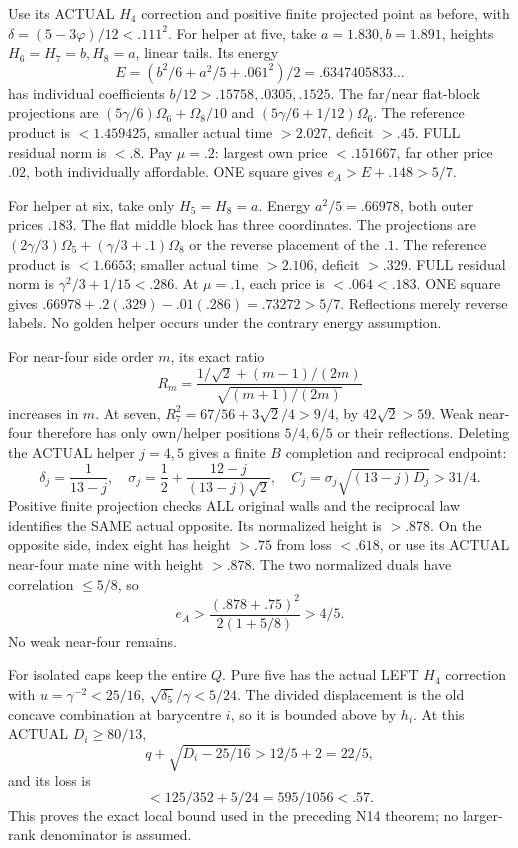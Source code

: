 \documentclass[11pt]{article}
\begin{document}
Use its ACTUAL \(H_4\) correction and positive
finite projected point as before, with
\(\delta=(5-3\varphi)/12<.111^2\).
For helper at five, take
\(a=1.830,b=1.891\), heights
\(H_6=H_7=b,H_8=a\), linear tails.
Its energy
\[
                 E=(b^2/6+a^2/5+.061^2)/2=.6347405833\ldots
\]
has individual coefficients
\(b/12>.15758,.0305,.1525\).
The far/near flat-block projections are
\((5\gamma/6)\Omega_6+\Omega_8/10\) and
\((5\gamma/6+1/12)\Omega_6\).
The reference product is \(<1.459425\),
smaller actual time \(>2.027\), deficit \(>.45\).
FULL residual norm is \(<.8\).
Pay \(\mu=.2\): largest own price
\(<.151667\), far other price \(.02\),
both individually affordable.
ONE square gives \(e_A>E+.148>5/7\).

For helper at six, take only \(H_5=H_8=a\).
Energy \(a^2/5=.66978\), both outer prices \(.183\).
The flat middle block has three coordinates.
The projections are
\((2\gamma/3)\Omega_5+(\gamma/3+.1)\Omega_8\)
or the reverse placement of the \(.1\).
The reference product is \(<1.6653\);
smaller actual time \(>2.106\), deficit \(>.329\).
FULL residual norm is \(\gamma^2/3+1/15<.286\).
At \(\mu=.1\), each price is \(<.064<.183\).
ONE square gives
\(.66978+.2(.329)-.01(.286)=.73272>5/7\).
Reflections merely reverse labels.
No golden helper occurs under the contrary
energy assumption.

For near-four side order \(m\), its exact ratio
\[
 R_m={\frac{1/\sqrt2+(m-1)/(2m)}{\sqrt{(m+1)/(2m)}}}
\]
increases in \(m\).
At seven,
\(R_7^2=67/56+3\sqrt2/4>9/4\), by \(42\sqrt2>59\).
Weak near-four therefore has only own/helper
positions \(5/4,6/5\) or their reflections.
Deleting the ACTUAL helper \(j=4,5\) gives a
finite \(B\) completion and reciprocal endpoint:
\[
 \delta_j={\frac{1}{13-j}},\quad
 \sigma_j={\frac{1}{2}}+{\frac{12-j}{(13-j)\sqrt2}},\quad
 C_j=\sigma_j\sqrt{(13-j)D_j}>31/4.
\]
Positive finite projection checks ALL original
walls and the reciprocal law identifies the
SAME actual opposite.
Its normalized height is \(>.878\).
On the opposite side, index eight has height
\(>.75\) from loss \(<.618\), or use its ACTUAL
near-four mate nine with height \(>.878\).
The two normalized duals have correlation
\(\le5/8\), so
\[
                       e_A>{\frac{(.878+.75)^2}{2(1+5/8)}}>4/5.
\]
No weak near-four remains.

For isolated caps keep the entire \(Q\).
Pure five has the actual LEFT \(H_4\)
correction with
\(u=\gamma^{-2}<25/16\),
\(\sqrt{\delta_5}/\gamma<5/24\).
The divided displacement is the old concave
combination at barycentre \(i\), so it is
bounded above by \(h_i\).
At this ACTUAL \(D_i\ge80/13\),
\[
 q+\sqrt{D_i-25/16}>12/5+2=22/5,
\]
and its loss is
\[
                    <125/352+5/24=595/1056<.57 .
\]
This proves the exact local bound used in
the preceding N14 theorem; no larger-rank
denominator is assumed.
\end{document}
